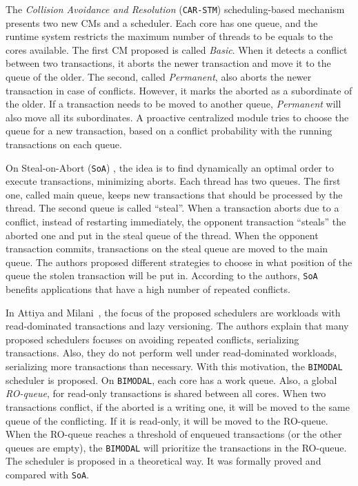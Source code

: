 The \emph{Collision Avoidance and Resolution} (\texttt{CAR-STM}) scheduling-based mechanism \cite{Dolev:2008} presents two new CMs and a scheduler. Each core has one queue, and the runtime system restricts the maximum number of threads to be equals to the cores available. The first CM proposed is called \emph{Basic}. When it detects a conflict between two transactions, it aborts the newer transaction and move it to the queue of the older. The second, called \emph{Permanent}, also aborts the newer transaction in case of conflicts. However, it marks the aborted as a subordinate of the older. If a transaction needs to be moved to another queue, \emph{Permanent} will also move all its subordinates. A proactive centralized module tries to choose the queue for a new transaction, based on a conflict probability with the running transactions on each queue. 

On Steal-on-Abort (\texttt{SoA}) \cite{Ansari:2009}, the idea is to find dynamically an optimal order to execute transactions, minimizing aborts. Each thread has two queues. The first one, called main queue, keeps new transactions that should be processed by the thread. The second queue is called ``steal''. When a transaction aborts due to a conflict, instead of restarting immediately, the opponent transaction ``steals'' the aborted one and put in the steal queue of the thread. When the opponent transaction commits, transactions on the steal queue are moved to the main queue. The authors proposed different strategies to choose in what position of the queue the stolen transaction will be put in. According to the authors, \texttt{SoA} benefits applications that have a high number of repeated conflicts. 

In Attiya and Milani~\citeyearpar{Attiya:2009,Attiya:2012}, the focus of the proposed schedulers are workloads with read-dominated transactions and lazy versioning. The authors explain that many proposed schedulers focuses on avoiding repeated conflicts, serializing transactions. Also, they do not perform well under read-dominated workloads, serializing more transactions than necessary. With this motivation, the \texttt{BIMODAL} scheduler is proposed. On \texttt{BIMODAL}, each core has a work queue. Also, a global \emph{RO-queue}, for read-only transactions is shared between all cores. When two transactions conflict, if the aborted is a writing one, it will be moved to the same queue of the conflicting. If it is read-only, it will be moved to the RO-queue. When the RO-queue reaches a threshold of enqueued transactions  (or the other queues are empty), the \texttt{BIMODAL} will prioritize the transactions in the RO-queue. The scheduler is proposed in a theoretical way. It was formally proved and compared with \texttt{SoA}.

